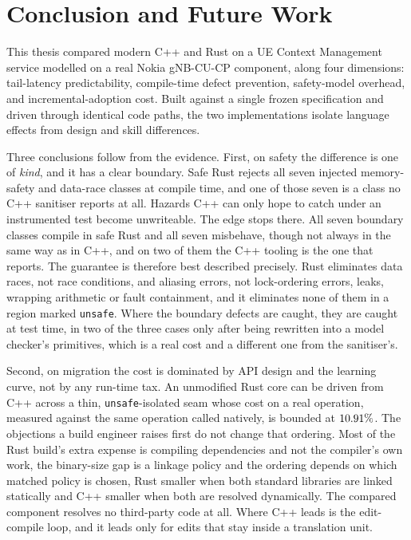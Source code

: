 \documentclass[english,oneside,a4paper,censored,csm,software-track-2020]{HYthesisML}
\begin{document}
\chapter{Conclusion and Future Work\label{chapter:conclusions}}

This thesis compared modern C++ and Rust on a UE Context Management service modelled on a real
Nokia gNB-CU-CP component, along four dimensions: tail-latency predictability, compile-time
defect prevention, safety-model overhead, and incremental-adoption cost. Built against a single
frozen specification and driven through identical code paths, the two implementations isolate
language effects from design and skill differences.

Three conclusions follow from the evidence. First, on safety the difference is one of
\emph{kind}, and it has a clear boundary. Safe Rust rejects all seven injected memory-safety and
data-race classes at compile time, and one of those seven is a class no C++ sanitiser reports at
all. Hazards C++ can only hope to catch under an instrumented test become unwriteable. The edge
stops there.
All seven boundary
classes compile in safe Rust and all seven misbehave, though not always in the same way as in C++,
and on two of them the C++
tooling is the one that reports. The guarantee is therefore best described precisely. Rust
eliminates data races, not race conditions, and aliasing errors, not lock-ordering errors,
leaks, wrapping arithmetic or fault containment, and it eliminates none of them in a region
marked \texttt{unsafe}. Where the boundary defects are caught, they are
caught at test time, in two of the three cases only after being rewritten into a model checker's
primitives, which is a real cost and a different one from the sanitiser's.

Second, on migration
the cost is dominated by API design and the learning curve, not by any run-time tax. An
unmodified Rust core can be driven from C++ across a thin, \texttt{unsafe}-isolated seam whose
cost on a real operation, measured against the same operation called natively, is bounded at
$10.91\%$. The objections a build engineer raises first do not change that ordering.
Most of the Rust build's extra expense is compiling dependencies and not the compiler's own work,
the binary-size gap is a linkage policy and the ordering depends on which matched policy is chosen,
Rust smaller when both standard libraries are linked statically and C++ smaller when both are
resolved dynamically. The compared
component resolves no third-party code at all. Where C++ leads is the edit-compile loop, and it
leads only for edits that stay inside a translation unit.
\end{document}
